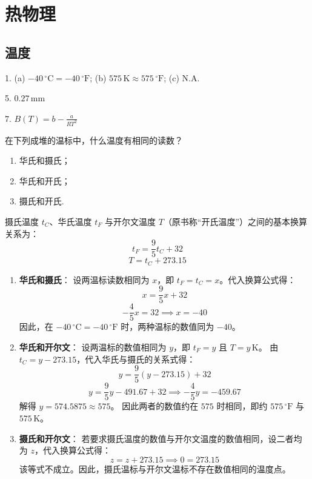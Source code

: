 
\part{热物理}

\chapter{温度}

\begin{oddanswers}
1. (a) $-40\,{}^\circ\mathrm{C}=-40\,{}^\circ\mathrm{F}$; (b) $575\,\mathrm{K}\approx575\,{}^\circ\mathrm{F}$; (c) N.A.

5. $0.27\,\mathrm{mm}$

7. $B(T) = b - \frac{a}{RT^2}$
\end{oddanswers}

\begin{exercise}\label{ex:10.1}
在下列成堆的温标中，什么温度有相同的读数？
\begin{enumerate}
  \item[(a)] 华氏和摄氏；
  \item[(b)] 华氏和开氏；
  \item[(c)] 摄氏和开氏.
\end{enumerate}
\end{exercise}
\begin{solution}
摄氏温度 $t_C$、华氏温度 $t_F$ 与开尔文温度 $T$（原书称“开氏温度”）之间的基本换算关系为：
$$ t_F = \frac{9}{5} t_C + 32 $$
$$ T = t_C + 273.15 $$

\begin{enumerate}
    \item[(a)] \textbf{华氏和摄氏}：
    设两温标读数相同为 $x$，即 $t_F = t_C = x$。代入换算公式得：
    $$ x = \frac{9}{5} x + 32 $$
    $$ -\frac{4}{5} x = 32 \implies x = -40 $$
    因此，在 $-40\,{}^\circ\mathrm{C}=-40\,{}^\circ\mathrm{F}$ 时，两种温标的数值同为 $-40$。

    \item[(b)] \textbf{华氏和开尔文}：
    设两温标的数值相同为 $y$，即 $t_F=y$ 且 $T=y\,\mathrm K$。
    由 $t_C = y - 273.15$，代入华氏与摄氏的关系式得：
    $$ y = \frac{9}{5} (y - 273.15) + 32 $$
    $$ y = \frac{9}{5} y - 491.67 + 32 \implies -\frac{4}{5} y = -459.67 $$
    解得 $y = 574.5875 \approx 575$。
    因此两者的数值约在 $575$ 时相同，即约 $575\,^{\circ}\mathrm F$ 与 $575\,\mathrm K$。

    \item[(c)] \textbf{摄氏和开尔文}：
    若要求摄氏温度的数值与开尔文温度的数值相同，设二者均为 $z$，代入换算公式得：
    $$ z = z + 273.15 \implies 0 = 273.15 $$
    该等式不成立。因此，摄氏温标与开尔文温标不存在数值相同的温度点。
\end{enumerate}
\end{solution}

